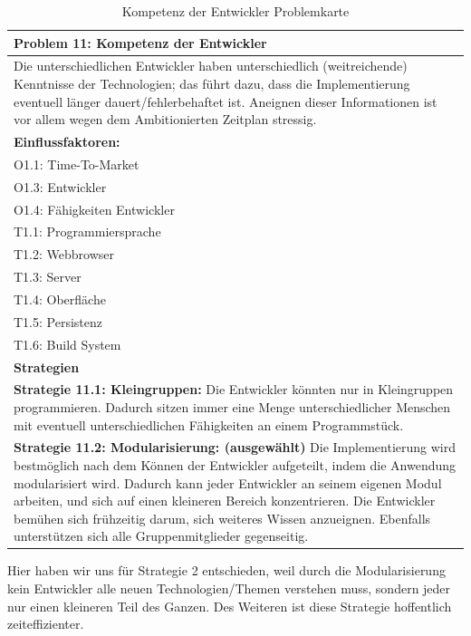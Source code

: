 \documentclass[enabledeprecatedfontcommands,fontsize=12pt,paper=a4,twoside]{scrartcl}
\begin{document}
\begin{table}[H]
    \centering
    \begin{tabular}{|p{15cm}|}
    \hline
          \textbf{Problem 11:} Kompetenz der Entwickler
          \\ \hline
          Die unterschiedlichen Entwickler haben unterschiedlich (weitreichende) Kenntnisse der Technologien; das führt dazu, dass die Implementierung eventuell länger dauert/fehlerbehaftet ist. Aneignen dieser Informationen ist vor allem wegen dem Ambitionierten Zeitplan stressig.
          \\ \hline
          \textbf{Einflussfaktoren: } \\
          O1.1: Time-To-Market \\
          O1.3: Entwickler \\
          O1.4: Fähigkeiten Entwickler \\
          T1.1: Programmiersprache \\
          T1.2: Webbrowser \\
          T1.3: Server \\
          T1.4: Oberfläche \\
          T1.5: Persistenz \\
          T1.6: Build System\\
          \hline
          \textbf{Strategien} \\ \hline
 		 {}          
           \label{strategie:14.1}     
          \textbf{Strategie 11.1: Kleingruppen:} Die Entwickler könnten nur in Kleingruppen programmieren. Dadurch sitzen immer eine Menge unterschiedlicher Menschen mit eventuell unterschiedlichen Fähigkeiten an einem Programmstück. \\
         {}          
           \label{strategie:11.2}     
          \textbf{Strategie 11.2: Modularisierung: (ausgewählt)} Die Implementierung wird bestmöglich nach dem Können der Entwickler aufgeteilt, indem die Anwendung modularisiert wird. Dadurch kann jeder Entwickler an seinem eigenen Modul arbeiten, und sich auf einen kleineren Bereich konzentrieren. Die Entwickler bemühen sich frühzeitig darum, sich weiteres Wissen anzueignen. Ebenfalls unterstützen sich alle Gruppenmitglieder gegenseitig.\\ \hline
    \end{tabular}
    \caption{ Kompetenz der Entwickler Problemkarte}
    \label{tab:ProblemKarte11}
\end{table}
Hier haben wir uns für Strategie 2 entschieden, weil durch die Modularisierung kein Entwickler alle neuen Technologien/Themen verstehen muss, sondern jeder nur einen kleineren Teil des Ganzen. Des Weiteren ist diese Strategie hoffentlich zeiteffizienter. \\
\end{document}
